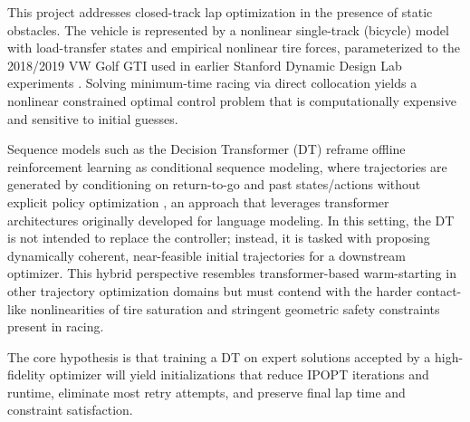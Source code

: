 \documentclass{article}
\begin{document}
This project addresses closed-track lap optimization in the presence of static obstacles. The vehicle is represented by a nonlinear single-track (bicycle) model with load-transfer states and empirical nonlinear tire forces, parameterized to the 2018/2019 VW Golf GTI used in earlier Stanford Dynamic Design Lab experiments \cite{subositsgerdes2021fidelity,aggarwal2025friction}. Solving minimum-time racing via direct collocation yields a nonlinear constrained optimal control problem that is computationally expensive and sensitive to initial guesses.

Sequence models such as the Decision Transformer (DT) reframe offline reinforcement learning as conditional sequence modeling, where trajectories are generated by conditioning on return-to-go and past states/actions without explicit policy optimization \cite{chen2021decision}, an approach that leverages transformer architectures originally developed for language modeling. In this setting, the DT is not intended to replace the controller; instead, it is tasked with proposing dynamically coherent, near-feasible initial trajectories for a downstream optimizer. This hybrid perspective resembles transformer-based warm-starting in other trajectory optimization domains \cite{guffanti2024transformers} but must contend with the harder contact-like nonlinearities of tire saturation and stringent geometric safety constraints present in racing.

The core hypothesis is that training a DT on expert solutions accepted by a high-fidelity optimizer will yield initializations that reduce IPOPT iterations and runtime, eliminate most retry attempts, and preserve final lap time and constraint satisfaction.

\end{document}
